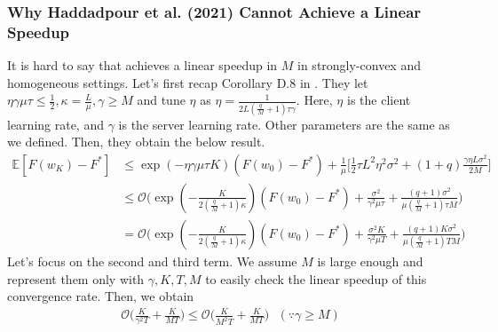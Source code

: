 \documentclass[11pt]{article}
\begin{document}
\subsubsection{Why Haddadpour et al. (2021) Cannot Achieve a Linear Speedup}
It is hard to say that \cite{Yeojoon-haddadpour2021federated} achieves a linear speedup in $M$ in strongly-convex and homogeneous settings. Let's first recap Corollary D.8 in \cite{Yeojoon-haddadpour2021federated}. They let $\eta\gamma\mu\tau \leq \frac{1}{2}, \kappa = \frac{L}{\mu}, \gamma \geq M$ and tune $\eta$ as $\eta = \frac{1}{2L(\frac{q}{M}+1)\tau\gamma}$. Here, $\eta$ is the client learning rate, and $\gamma$ is the server learning rate. Other parameters are the same as we defined. Then, they obtain the below result.
\begin{align} \label{app:C1-rate1}
    \mathbb{E}[F(w_K)- F^*] &\leq \exp(-\eta\gamma\mu\tau K)(F(w_0) - F^*) + \frac{1}{\mu}\Big[\frac{1}{2}\tau L^2\eta^2\sigma^2 + (1+q)\frac{\gamma\eta L\sigma^2}{2M}\Big] \\
    &\leq \mathcal{O} \Big(\exp(-\frac{K}{2(\frac{q}{M}+1)\kappa})(F(w_0) - F^*) + \frac{\sigma^2}{\gamma^2\mu\tau} + \frac{(q+1)\sigma^2}{\mu(\frac{q}{M}+1)\tau M} \Big) \nonumber \\
    &= \mathcal{O} \Big(\exp(-\frac{K}{2(\frac{q}{M}+1)\kappa})(F(w_0) - F^*) + \frac{\sigma^2 K}{\gamma^2\mu T} + \frac{(q+1)K \sigma^2}{\mu(\frac{q}{M}+1)T M} \Big) \nonumber
\end{align}
Let's focus on the second and third term. We assume $M$ is large enough and represent them only with $\gamma, K, T, M$ to easily check the linear speedup of this convergence rate. Then, we obtain
\begin{align} \label{app:C1-rate2}
    \mathcal{O}\Big( \frac{K}{\gamma^2 T} + \frac{K}{MT}\Big) \leq \mathcal{O}\Big( \frac{K}{M^2 T} + \frac{K}{MT}\Big) \textrm{ }(\because \gamma \geq M)
\end{align}
\end{document}
